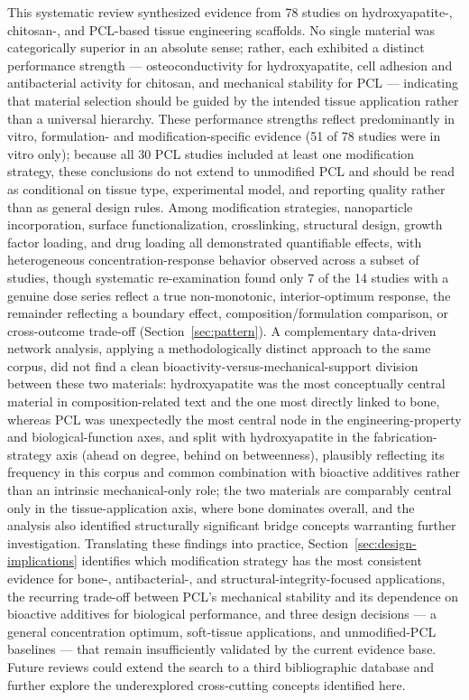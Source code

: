 \documentclass[5p,times,twocolumn]{elsarticle}
\begin{document}
This systematic review synthesized evidence from 78 studies on hydroxyapatite-, chitosan-, and PCL-based tissue engineering scaffolds. No single material was categorically superior in an absolute sense; rather, each exhibited a distinct performance strength --- osteoconductivity for hydroxyapatite, cell adhesion and antibacterial activity for chitosan, and mechanical stability for PCL --- indicating that material selection should be guided by the intended tissue application rather than a universal hierarchy. These performance strengths reflect predominantly in vitro, formulation- and modification-specific evidence (51 of 78 studies were in vitro only); because all 30 PCL studies included at least one modification strategy, these conclusions do not extend to unmodified PCL and should be read as conditional on tissue type, experimental model, and reporting quality rather than as general design rules. Among modification strategies, nanoparticle incorporation, surface functionalization, crosslinking, structural design, growth factor loading, and drug loading all demonstrated quantifiable effects, with heterogeneous concentration-response behavior observed across a subset of studies, though systematic re-examination found only 7 of the 14 studies with a genuine dose series reflect a true non-monotonic, interior-optimum response, the remainder reflecting a boundary effect, composition/formulation comparison, or cross-outcome trade-off (Section~\ref{sec:pattern}). A complementary data-driven network analysis, applying a methodologically distinct approach to the same corpus, did not find a clean bioactivity-versus-mechanical-support division between these two materials: hydroxyapatite was the most conceptually central material in composition-related text and the one most directly linked to bone, whereas PCL was unexpectedly the most central node in the engineering-property and biological-function axes, and split with hydroxyapatite in the fabrication-strategy axis (ahead on degree, behind on betweenness), plausibly reflecting its frequency in this corpus and common combination with bioactive additives rather than an intrinsic mechanical-only role; the two materials are comparably central only in the tissue-application axis, where bone dominates overall, and the analysis also identified structurally significant bridge concepts warranting further investigation. Translating these findings into practice, Section~\ref{sec:design-implications} identifies which modification strategy has the most consistent evidence for bone-, antibacterial-, and structural-integrity-focused applications, the recurring trade-off between PCL's mechanical stability and its dependence on bioactive additives for biological performance, and three design decisions --- a general concentration optimum, soft-tissue applications, and unmodified-PCL baselines --- that remain insufficiently validated by the current evidence base. Future reviews could extend the search to a third bibliographic database and further explore the underexplored cross-cutting concepts identified here.
\end{document}
